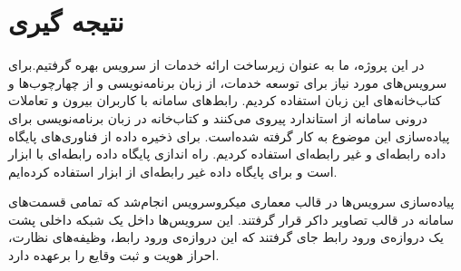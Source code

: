 \section{نتیجه گیری}

در این پروژه، ما به عنوان زیرساخت ارائه خدمات  از سرویس  بهره گرفتیم.برای سرویس‌های مورد نیاز برای توسعه خدمات، از زبان برنامه‌نویسی  و از چهارچوب‌ها و کتاب‌خانه‌های این زبان استفاده کردیم. رابط‌های سامانه با کاربران بیرون و تعاملات درونی سامانه از استاندارد  پیروی می‌کنند و کتاب‌خانه  در زبان برنامه‌نویسی  برای پیاده‌سازی این موضوع به کار گرفته شده‌است. برای ذخیره داده از فناوری‌های پایگاه داده رابطه‌ای و غیر رابطه‌ای استفاده کردیم. راه اندازی پایگاه داده رابطه‌ای با ابزار  است و برای پایگاه داده غیر رابطه‌ای از ابزار  استفاده کرده‌ایم.

پیاده‌سازی سرویس‌ها در قالب معماری میکروسرویس انجام‌شد که تمامی قسمت‌های سامانه در قالب تصاویر داکر قرار گرفتند. این سرویس‌ها داخل یک شبکه داخلی پشت یک ‌دروازه‌ی ورود رابط جای گرفتند که این ‌دروازه‌ی ورود رابط، وظیفه‌های نظارت، احراز هویت و ثبت وقایع را برعهده دارد.